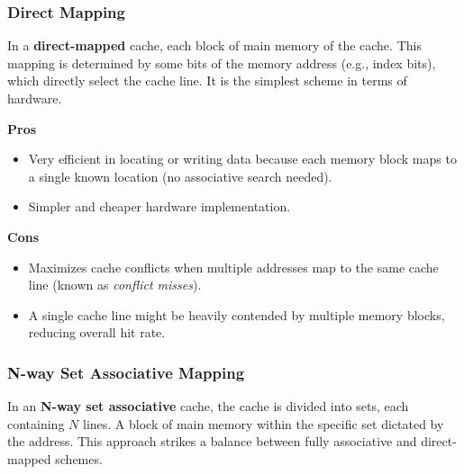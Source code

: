 \subsubsection{Direct Mapping}
In a \textbf{direct-mapped} cache, each block of main memory  of the cache. This mapping is determined by some bits of the memory address (e.g., index bits), which directly select the cache line. It is the simplest scheme in terms of hardware.

\begin{minipage}[t]{0.48\textwidth}
    \textbf{Pros}
    \begin{itemize}
        \item Very efficient in locating or writing data because each memory block maps to a single known location (no associative search needed).
        \item Simpler and cheaper hardware implementation.
    \end{itemize}
\end{minipage}\hspace{1em}
\begin{minipage}[t]{0.48\textwidth}
    \textbf{Cons}
    \begin{itemize}
        \item Maximizes cache conflicts when multiple addresses map to the same cache line (known as \textit{conflict misses}).
        \item A single cache line might be heavily contended by multiple memory blocks, reducing overall hit rate.
    \end{itemize}
\end{minipage}

\subsubsection{N-way Set Associative Mapping}
In an \textbf{N-way set associative} cache, the cache is divided into sets, each containing $N$ lines. A block of main memory  within the specific set dictated by the address. This approach strikes a balance between fully associative and direct-mapped schemes.


